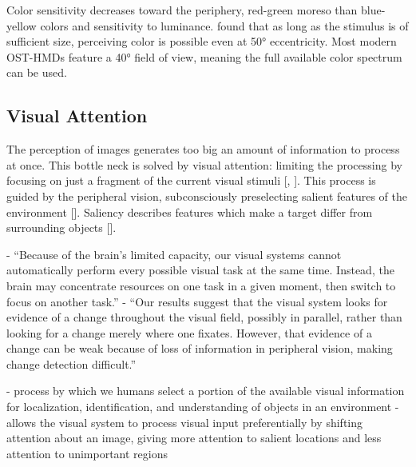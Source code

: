 Color sensitivity decreases toward the periphery, red-green moreso than blue-yellow colors and sensitivity to luminance. \textcite{hansenColorPerceptionIntermediate2009} found that as long as the stimulus is of sufficient size, perceiving color is possible even at 50° eccentricity. Most modern OST-HMDs feature a 40° field of view, meaning the full available color spectrum can be used.

\subsection{Visual Attention}

The perception of images generates too big an amount of information to process at once. This bottle neck is solved by visual attention: limiting the processing by focusing on just a fragment of the current visual stimuli [\cite{andersonDirectedVisualAttention2005}, \cite{rosenholtzCapabilitiesLimitationsPeripheral2016}]. This process is guided by the peripheral vision, subconsciously preselecting salient features of the environment [\cite{}]. Saliency describes features which make a target differ from surrounding objects [\cite{johnsonChapter5Our2014}].

\cite{rosenholtzCapabilitiesLimitationsPeripheral2016}
- “Because of the brain's limited capacity, our visual systems cannot automatically perform every possible visual task at the same time. Instead, the brain may concentrate resources on one task in a given moment, then switch to focus on another task.”
- “Our results suggest that the visual system looks for evidence of a change throughout the visual field, possibly in parallel, rather than looking for a change merely where one fixates. However, that evidence of a change can be weak because of loss of information in peripheral vision, making change detection difficult.”

\cite{caterSelectiveQualityRendering2002}
- process by which we humans select a portion of the available visual information for localization, identification, and understanding of objects in an environment
- allows the visual system to process visual input preferentially by shifting attention about an image, giving more attention to salient locations and less attention to unimportant regions



